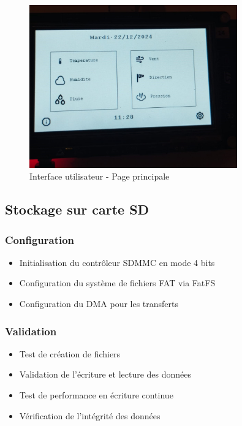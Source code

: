 \documentclass[12pt]{article}
\begin{document}
\begin{figure}[H]
    \capstart
    \centering
    \includegraphics[width=0.8\textwidth]{./images/interface_mainpage.jpg}
    \caption{Interface utilisateur - Page principale}
    \label{fig:interface_mainpage}
\end{figure}

\subsection{Stockage sur carte SD}
\subsubsection{Configuration}
\begin{itemize}
    \item Initialisation du contrôleur SDMMC en mode 4 bits
    \item Configuration du système de fichiers FAT via FatFS
    \item Configuration du DMA pour les transferts
\end{itemize}

\subsubsection{Validation}
\begin{itemize}
    \item Test de création de fichiers
    \item Validation de l'écriture et lecture des données
    \item Test de performance en écriture continue
    \item Vérification de l'intégrité des données
\end{itemize}
\end{document}
